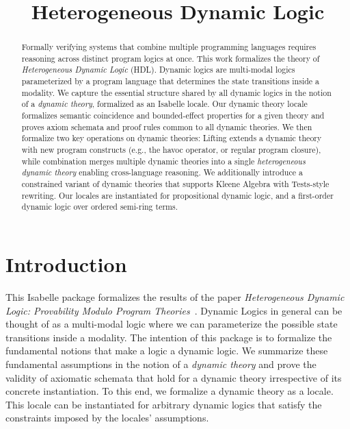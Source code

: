 \documentclass[11pt,a4paper]{article}
\begin{document}
\title{Heterogeneous Dynamic Logic}
\maketitle

\begin{abstract}
Formally verifying systems that combine multiple programming languages
requires reasoning across distinct program logics at once.
This work formalizes the theory of \emph{Heterogeneous Dynamic Logic} (HDL).
Dynamic logics are multi-modal logics parameterized by a program language
that determines the state transitions inside a modality.
We capture the essential structure shared by all dynamic logics
in the notion of a \emph{dynamic theory},
formalized as an Isabelle locale.
Our dynamic theory locale formalizes semantic coincidence and bounded-effect
properties for a given theory and proves axiom schemata and proof rules
common to all dynamic theories.
We then formalize two key operations on dynamic theories:
Lifting extends a dynamic theory with new program constructs
(e.g., the havoc operator, or regular program closure),
while combination merges multiple dynamic theories into a
single \emph{heterogeneous dynamic theory} enabling cross-language reasoning.
We additionally introduce a constrained variant of dynamic theories
that supports Kleene Algebra with Tests-style rewriting.
Our locales are instantiated for propositional dynamic logic, and
a first-order dynamic logic over ordered semi-ring terms.
\end{abstract}

\section{Introduction}
This Isabelle package formalizes the results of the paper
\emph{Heterogeneous Dynamic Logic: Provability Modulo Program Theories}~\cite{DBLP:journals/corr/abs-2507-08581}.
Dynamic Logics in general can be thought of as a multi-modal logic where
we can parameterize the possible state transitions inside a modality.
The intention of this package is to formalize the fundamental notions that
make a logic a dynamic logic.
We summarize these fundamental assumptions in the notion of a \emph{dynamic theory}
and prove the validity of axiomatic schemata
that hold for a dynamic theory irrespective of its concrete instantiation.
To this end, we formalize a dynamic theory as a locale.
This locale can be instantiated for arbitrary dynamic logics that
satisfy the constraints imposed by the locales' assumptions.
\end{document}
